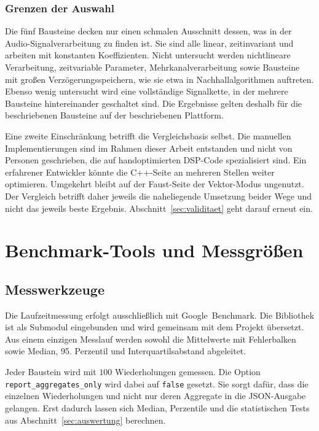 \subsubsection*{Grenzen der Auswahl}

Die fünf Bausteine decken nur einen schmalen Ausschnitt dessen, was in der Audio-Signalverarbeitung zu finden ist. Sie sind alle linear, zeitinvariant und
arbeiten mit konstanten Koeffizienten.
Nicht untersucht werden nichtlineare Verarbeitung, zeitvariable Parameter,
Mehrkanalverarbeitung sowie Bausteine mit großen Verzögerungsspeichern, wie
sie etwa in Nachhallalgorithmen auftreten. Ebenso wenig untersucht wird eine
vollständige Signalkette, in der mehrere Bausteine hintereinander geschaltet sind. Die Ergebnisse gelten
deshalb für die beschriebenen Bausteine auf der beschriebenen Plattform.

Eine zweite Einschränkung betrifft die Vergleichsbasis selbst. Die manuellen
Implementierungen sind im Rahmen dieser Arbeit entstanden und nicht von
Personen geschrieben, die auf handoptimierten DSP-Code spezialisiert sind. Ein
erfahrener Entwickler könnte die C++-Seite an mehreren Stellen weiter
optimieren. Umgekehrt bleibt auf der Faust-Seite der Vektor-Modus ungenutzt.
Der Vergleich betrifft daher jeweils die naheliegende Umsetzung beider Wege
und nicht das jeweils beste Ergebnis. Abschnitt~\ref{sec:validitaet} geht darauf
erneut ein.

\section{Benchmark-Tools und Messgrößen}

\label{sec:tools}

\subsection{Messwerkzeuge}

Die Laufzeitmessung erfolgt ausschließlich mit Google~Benchmark. Die
Bibliothek ist als Submodul eingebunden und wird gemeinsam mit dem Projekt
übersetzt. Aus einem einzigen Messlauf werden sowohl die Mittelwerte mit
Fehlerbalken sowie Median, 95. Perzentil und Interquartilsabstand
abgeleitet.

Jeder Baustein wird mit $100$ Wiederholungen gemessen. Die Option
\texttt{report\_\allowbreak aggregates\_\allowbreak only} wird dabei auf
\texttt{false} gesetzt. Sie
sorgt dafür, dass die einzelnen Wiederholungen und nicht nur deren Aggregate
in die JSON-Ausgabe gelangen. Erst dadurch lassen sich Median, Perzentile und die statistischen Tests aus Abschnitt~\ref{sec:auswertung} berechnen.

